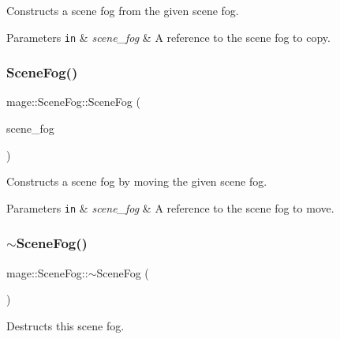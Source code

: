 Constructs a scene fog from the given scene fog.


\begin{DoxyParams}[1]{Parameters}
\mbox{\tt in}  & {\em scene\+\_\+fog} & A reference to the scene fog to copy. \\
\hline
\end{DoxyParams}
\hypertarget{classmage_1_1_scene_fog_a6080ed91eb76b5872646ca8d778a2856}{}\label{classmage_1_1_scene_fog_a6080ed91eb76b5872646ca8d778a2856} 
\subsubsection{\texorpdfstring{Scene\+Fog()}{SceneFog()}\hspace{0.1cm}{\footnotesize\ttfamily [3/3]}}
{\footnotesize\ttfamily mage\+::\+Scene\+Fog\+::\+Scene\+Fog (\begin{DoxyParamCaption}\item[{\hyperlink{classmage_1_1_scene_fog}{Scene\+Fog} \&\&}]{scene\+\_\+fog }\end{DoxyParamCaption})\hspace{0.3cm}{\ttfamily [default]}}

Constructs a scene fog by moving the given scene fog.


\begin{DoxyParams}[1]{Parameters}
\mbox{\tt in}  & {\em scene\+\_\+fog} & A reference to the scene fog to move. \\
\hline
\end{DoxyParams}
\hypertarget{classmage_1_1_scene_fog_afb25181d31f74e4981c226019fee0669}{}\label{classmage_1_1_scene_fog_afb25181d31f74e4981c226019fee0669} 
\subsubsection{\texorpdfstring{$\sim$\+Scene\+Fog()}{~SceneFog()}}
{\footnotesize\ttfamily mage\+::\+Scene\+Fog\+::$\sim$\+Scene\+Fog (\begin{DoxyParamCaption}{ }\end{DoxyParamCaption})\hspace{0.3cm}{\ttfamily [default]}}

Destructs this scene fog. 


